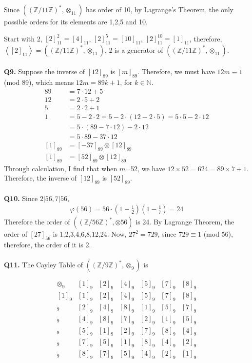 \documentclass{article}[12pt]
\begin{document}
Since $\left((\mathbb{Z} / 11 \mathbb{Z})^{*}, \otimes_{11}\right)$ has order of 10, by Lagrange's Theorem, the only possible orders for its elements are 1,2,5 and 10.\par
Start with 2, $[2]_{11}^{2}=[4]_{11}$, $[2]_{11}^{5}=[10]_{11}$, $[2]_{11}^{10}=[1]_{11}$, therefore, $\left\langle[2]_{11}\right\rangle=\left((\mathbb{Z} / 11 \mathbb{Z})^{*}, \otimes_{11}\right)$, 2 is a generator of $\left((\mathbb{Z} / 11 \mathbb{Z})^{*}, \otimes_{11}\right)$.
\\ \\
\noindent \textbf{Q9.}
Suppose the inverse of $[12]_{89}$ is $[m]_{89}$. Therefore, we must have $12m\equiv 1$ (mod 89), which means $12m=89k+1$, for $k\in \mathbb{N}$. 
\begin{align*}
89&=7\cdot 12+5\\
12&=2\cdot 5+2\\
5&=2\cdot 2+1\\
1&=5-2\cdot 2=5-2\cdot (12-2\cdot 5)=5\cdot 5-2\cdot 12\\
&=5\cdot(89-7\cdot 12)-2\cdot 12\\
&=5\cdot 89 -37\cdot 12\\
[1]_{89}&=[-37]_{89}\otimes [12]_{89}\\
[1]_{89}&=[52]_{89}\otimes [12]_{89}
\end{align*}
Through calculation, I find that when $m$=52, we have $12\times 52=624=89\times 7+1$. Therefore, the inverse of $[12]_{89}$ is $[52]_{89}.$
\\ \\
\noindent \textbf{Q10.}
Since $2|56,7|56$, \begin{align*}
\varphi(56)=56\cdot(1-\frac{1}{2})(1-\frac{1}{7})=24
\end{align*}
Therefore the order of $\left((\mathbb{Z} / 56 \mathbb{Z})^{*}, \otimes 56\right)$ is 24. By Lagrange Theorem, the order of $[27]_{56}$ is 1,2,3,4,6,8,12,24. Now, $27^2=729$, since $729\equiv 1$ (mod 56), therefore, the order of it is 2.
\\ \\
\noindent \textbf{Q11.}
The Cayley Table of $\left((\mathbb{Z} / 9 \mathbb{Z})^{*}, \otimes_{9}\right)$ is 
\begin{table} [H]
$$\begin{array}{|c||c|c|c|c|c|c|}
\otimes_{9} & [1]_9 & [2]_9 & [4]_9 & [5]_9& [7]_9& [8]_9\\
\hline\hline
[1]_9 & [1]_9 & [2]_9  & [4]_9 & [5]_9 & [7]_9 & [8]_9\\

[2]_9 & [2]_9 & [4]_9  & [8]_9 & [1]_9 & [5]_9 & [7]_9\\

[4]_9 & [4]_9 & [8]_9  & [7]_9 & [2]_9 & [1]_9 & [5]_9\\

[5]_9 & [5]_9 & [1]_9  & [2]_9 & [7]_9 & [8]_9 & [4]_9\\

[7]_9 & [7]_9 & [5]_9  & [1]_9 & [8]_9 & [4]_9 & [2]_9\\

[8]_9 & [8]_9 & [7]_9  & [5]_9 & [4]_9 & [2]_9 & [1]_9\\
\end{array}$$
\end{table}
\end{document}
